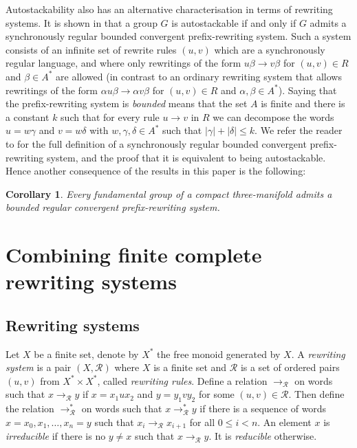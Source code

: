 \documentclass[12pt, a4paper]{amsart}
\newtheorem{corollary}[theorem]{Corollary}
\theoremstyle{definition}
\begin{document}
Autostackability also has an alternative characterisation in terms of rewriting systems. It is shown in \cite{Brittenham2014} that a group $G$ is autostackable if and only if $G$ admits a synchronously regular bounded convergent prefix-rewriting system. Such a system consists of an infinite set of rewrite rules $(u,v)$ which are a synchronously regular language, and where only rewritings of the form $u \beta \rightarrow v \beta$ for $(u,v) \in R$ and $\beta \in A^*$ are allowed (in contrast to an ordinary rewriting system that allows     
rewritings of the form $\alpha u \beta \rightarrow \alpha v \beta$ for $(u,v) \in R$ and $\alpha, \beta \in A^*$). 
Saying that the prefix-rewriting system is \emph{bounded} means that the set $A$ is finite and there is a constant $k$ such that for every rule $u \rightarrow v$ in $R$ we can decompose the words $u = w \gamma$ and $v = w \delta$ with $w, \gamma, \delta \in A^*$ such that $|\gamma| + |\delta| \leq k$. We refer the reader to \cite[Section~1]{Brittenham2014} for the full definition of a   
synchronously regular bounded convergent prefix-rewriting system, and the proof that it is equivalent to being autostackable. Hence another consequence of the results in this paper is the following: 

\begin{corollary} 
Every fundamental group of a compact three-manifold admits a bounded regular convergent prefix-rewriting system.
\end{corollary}





\section{Combining finite complete rewriting systems}
\label{sec:combining}


\subsection{Rewriting systems}

Let $X$ be a finite set, denote by $X^*$ the free monoid generated by $X$. A \emph{rewriting system} is a pair $(X, \mathcal{R})$ where $X$ is a finite set and $\mathcal{R}$ is a set of ordered pairs $(u, v)$ from $X^*\times X^*$, called \emph{rewriting rules}. Define a relation $\to_{\mathcal{R}}$ on words such that $x\to_{\mathcal{R}} y$ if $x = x_1ux_2$ and $y = y_1vy_2$ for some $(u, v)\in \mathcal{R}$. Then define the relation $ \to_{\mathcal{R}}^*$ on words such that $x\to_{\mathcal{R}}^*y$ if there is a sequence of words $x = x_0, x_1, \ldots, x_n = y$ such that $x_i\to_{\mathcal{R}} x_{i+1}$ for all $0\leqslant i<n$. An element $x$ is \emph{irreducible} if there is no $y\neq x$ such that $x\to_{\mathcal{R}} y$. It is \emph{reducible} otherwise.
\end{document}
